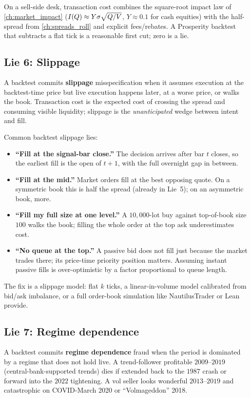 On a sell-side desk, transaction cost combines the square-root
impact law of \cref{ch:market_impact}
($I(Q) \approx Y\sigma\sqrt{Q/V}$, $Y \approx 0.1$ for cash equities)
with the half-spread from \cref{ch:spreads_roll} and explicit
fees/rebates. A Prosperity backtest that subtracts a flat tick is a
reasonable first cut; zero is a lie.

\subsection{Lie 6: Slippage}
\label{subsec:lie_slippage}

A backtest commits \textbf{slippage} misspecification when it
assumes execution at the backtest-time price but live execution
happens later, at a worse price, or walks the book. Transaction cost
is the expected cost of crossing the spread and consuming visible
liquidity; slippage is the \emph{unanticipated} wedge between intent
and fill.

Common backtest slippage lies:
\begin{itemize}
  \item \textbf{``Fill at the signal-bar close.''} The decision
  arrives after bar $t$ closes, so the earliest fill is the open
  of $t + 1$, with the full overnight gap in between.
  \item \textbf{``Fill at the mid.''} Market orders fill at the
  best opposing quote. On a symmetric book this is half the
  spread (already in Lie~5); on an asymmetric book, more.
  \item \textbf{``Fill my full size at one level.''} A
  $10{,}000$-lot buy against top-of-book size $100$ walks the
  book; filling the whole order at the top ask underestimates
  cost.
  \item \textbf{``No queue at the top.''} A passive bid does not
  fill just because the market trades there; its price-time
  priority position matters. Assuming instant passive fills is
  over-optimistic by a factor proportional to queue length.
\end{itemize}
The fix is a slippage model: flat $k$ ticks, a linear-in-volume
model calibrated from bid/ask imbalance, or a full order-book
simulation like NautilusTrader or Lean provide.

\subsection{Lie 7: Regime dependence}
\label{subsec:lie_regime}

A backtest commits \textbf{regime dependence} fraud when the period
is dominated by a regime that does not hold live. A trend-follower
profitable $2009$--$2019$ (central-bank-supported trends) dies if
extended back to the $1987$ crash or forward into the $2022$
tightening. A vol seller looks wonderful $2013$--$2019$ and
catastrophic on COVID-March 2020 or ``Volmageddon'' 2018.

